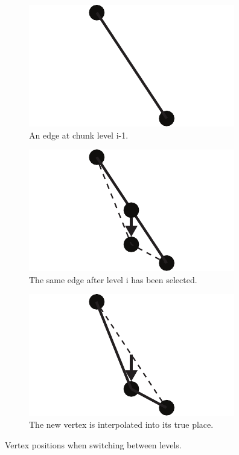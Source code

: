 \begin{figure}[htbp]
    \centering
    \begin{subfigure}[t]{0.3\textwidth}
        \includegraphics[width=\textwidth]{figures/chunkedlod/switching1.pdf}
        \caption{An edge at chunk level i-1.}
    \end{subfigure}
    \quad
    \begin{subfigure}[t]{0.3\textwidth}
        \includegraphics[width=\textwidth]{figures/chunkedlod/switching2.pdf}
        \caption{The same edge after level i has been selected.}
    \end{subfigure}
    \quad
    \begin{subfigure}[t]{0.3\textwidth}
        \includegraphics[width=\textwidth]{figures/chunkedlod/switching3.pdf}
        \caption{The new vertex is interpolated into its true place.}
    \end{subfigure}
    \caption{Vertex positions when switching between levels.}
    \label{fig:lodswitch}
\end{figure}

